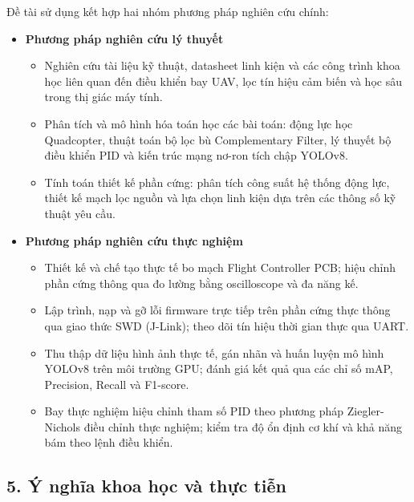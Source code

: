 Đề tài sử dụng kết hợp hai nhóm phương pháp nghiên cứu chính:

\begin{itemize}
    \item \textbf{Phương pháp nghiên cứu lý thuyết}
    \begin{itemize}
        \item Nghiên cứu tài liệu kỹ thuật, datasheet linh kiện và các công trình khoa học liên quan đến điều khiển bay UAV, lọc tín hiệu cảm biến và học sâu trong thị giác máy tính.
        \item Phân tích và mô hình hóa toán học các bài toán: động lực học Quadcopter, thuật toán bộ lọc bù Complementary Filter, lý thuyết bộ điều khiển PID và kiến trúc mạng nơ-ron tích chập YOLOv8.
        \item Tính toán thiết kế phần cứng: phân tích công suất hệ thống động lực, thiết kế mạch lọc nguồn và lựa chọn linh kiện dựa trên các thông số kỹ thuật yêu cầu.
    \end{itemize}

    \item \textbf{Phương pháp nghiên cứu thực nghiệm}
    \begin{itemize}
        \item Thiết kế và chế tạo thực tế bo mạch Flight Controller PCB; hiệu chỉnh phần cứng thông qua đo lường bằng oscilloscope và đa năng kế.
        \item Lập trình, nạp và gỡ lỗi firmware trực tiếp trên phần cứng thực thông qua giao thức SWD (J-Link); theo dõi tín hiệu thời gian thực qua UART.
        \item Thu thập dữ liệu hình ảnh thực tế, gán nhãn và huấn luyện mô hình YOLOv8 trên môi trường GPU; đánh giá kết quả qua các chỉ số mAP, Precision, Recall và F1-score.
        \item Bay thực nghiệm hiệu chỉnh tham số PID theo phương pháp Ziegler-Nichols điều chỉnh thực nghiệm; kiểm tra độ ổn định cơ khí và khả năng bám theo lệnh điều khiển.
    \end{itemize}
\end{itemize}

\subsection*{5. Ý nghĩa khoa học và thực tiễn}


